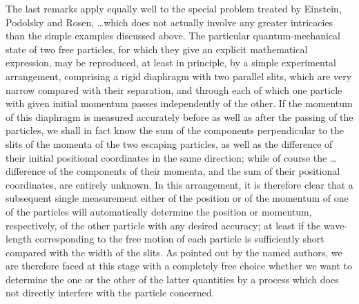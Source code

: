 \documentclass[11pt]{memoir}
\begin{document}
The last remarks apply equally well to the special problem treated by
Einstein, Podolsky and Rosen, \ldots which does not actually involve any
greater intricacies than the simple examples discussed above. The
particular quantum-mechanical state of two free particles, for which
they give an explicit mathematical expression, may be reproduced, at
least in principle, by a simple experimental arrangement, comprising a
rigid diaphragm with two parallel slits, which are very narrow compared
with their separation, and through each of which one particle with given
initial momentum passes independently of the other. If the momentum of
this diaphragm is measured accurately before as well as after the
passing of the particles, we shall in fact know the sum of the
components perpendicular to the slits of the momenta of the two escaping
particles, as well as the difference of their initial positional
coordinates in the same direction; while of course the \ldots{}
difference of the components of their momenta, and the sum of their
positional coordinates, are entirely unknown. In this arrangement, it is
therefore clear that a subsequent single measurement either of the
position or of the momentum of one of the particles will automatically
determine the position or momentum, respectively, of the other particle
with any desired accuracy; at least if the wave-length corresponding to
the free motion of each particle is sufficiently short compared with the
width of the slits. As pointed out by the named authors, we are
therefore faced at this stage with a completely free choice whether we
want to determine the one or the other of the latter quantities by a
process which does not directly interfere with the particle concerned.
\end{document}
